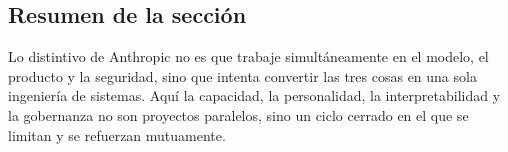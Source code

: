 \subsection{Resumen de la sección}

Lo distintivo de Anthropic no es que trabaje simultáneamente en el modelo, el producto y la seguridad, sino que intenta convertir las tres cosas en una sola ingeniería de sistemas. Aquí la capacidad, la personalidad, la interpretabilidad y la gobernanza no son proyectos paralelos, sino un ciclo cerrado en el que se limitan y se refuerzan mutuamente.


